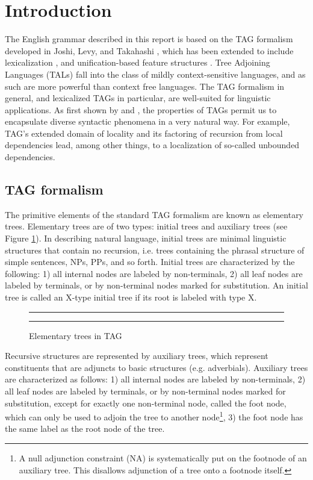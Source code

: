 \section{Introduction}
The English grammar described in this report is based on the TAG formalism
developed in Joshi, Levy, and Takahashi \cite{joshi75}, which has been extended
to include lexicalization \cite{schabes88}, and unification-based feature
structures \cite{vijay91}. Tree Adjoining Languages (TALs) fall into the class
of mildly context-sensitive languages, and as such are more powerful than
context free languages.  The TAG formalism in general, and lexicalized TAGs in
particular, are well-suited for linguistic applications.  As first shown by
\cite{joshi85} and \cite{kj87}, the properties of TAGs permit us to encapsulate
diverse syntactic phenomena in a very natural way.  For example, TAG's extended
domain of locality and its factoring of recursion from local dependencies lead,
among other things, to a localization of so-called unbounded dependencies.

\subsection{TAG formalism}

The primitive elements of the standard TAG formalism are known as {\sc
elementary trees}.  Elementary trees are of two types: {\sc initial trees} and
{\sc auxiliary trees} (see Figure \ref{elem-fig}).  In describing natural
language, {\sc initial trees} are minimal linguistic structures that contain no
recursion, i.e. trees containing the phrasal structure of simple sentences,
NPs, PPs, and so forth.  Initial trees are characterized by the following: 1)
all internal nodes are labeled by non-terminals, 2) all leaf nodes are labeled
by terminals, or by non-terminal nodes marked for substitution. An initial tree
is called an X-type initial tree if its root is labeled with type X.  

\begin{figure}[ht]
\centering
\rule[.1in]{\textwidth}{0.01in} 
\caption{Elementary trees in TAG}
\rule[.1in]{\textwidth}{0.01in} 
\label{elem-fig}
\end{figure}

Recursive structures are represented by {\sc auxiliary trees}, which represent
constituents that are adjuncts to basic structures (e.g. adverbials).  {\sc
Auxiliary trees} are characterized as follows: 1) all internal nodes are
labeled by non-terminals, 2) all leaf nodes are labeled by terminals, or by
non-terminal nodes marked for substitution, except for exactly one non-terminal
node, called the foot node, which can only be used to adjoin the tree to
another node\footnote{A null adjunction constraint (NA) is systematically put
on the footnode of an auxiliary tree. This disallows adjunction of a tree onto
a footnode itself.}, 3) the foot node has the same label as the root node of
the tree.


